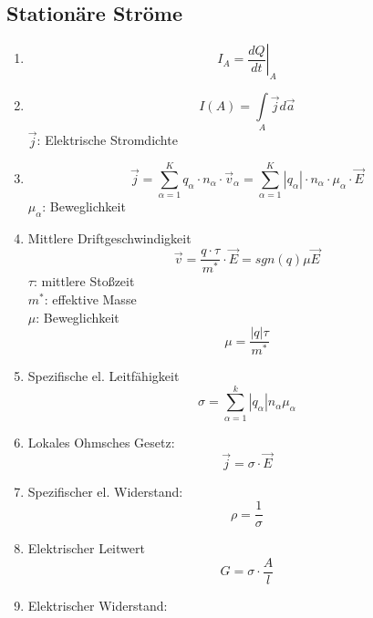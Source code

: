 \documentclass[a4paper,twocolumn,10pt]{article}
\begin{document}
\subsection{Stationäre Ströme}
\begin{enumerate}[label=$\bullet$]
\item
\begin{equation*}
I_A=\left.\frac{dQ}{dt}\right|_A
\end{equation*}
\item
\begin{equation*}
I(A)=\int\limits_{A}\overrightarrow{j}d\overrightarrow{a}
\end{equation*}
$\overrightarrow{j}$: Elektrische Stromdichte
\item
\begin{equation*}
\overrightarrow{j}=\sum\limits_{\alpha=1}^{K}q_\alpha\cdot n_\alpha\cdot\overrightarrow{v}_\alpha=\sum\limits_{\alpha=1}^{K}|q_\alpha |\cdot n_\alpha\cdot\mu_\alpha\cdot\overrightarrow{E}
\end{equation*}
$\mu_\alpha$: Beweglichkeit
\item Mittlere Driftgeschwindigkeit
\begin{equation*}
\overrightarrow{v}=\frac{q\cdot\tau}{m^*}\cdot\overrightarrow{E}=sgn(q)\mu\overrightarrow{E}
\end{equation*}
$\tau$: mittlere Stoßzeit\\
$m^*$: effektive Masse\\
$\mu$: Beweglichkeit
\begin{equation*}
\mu=\frac{|q|\tau}{m^*}
\end{equation*}
\item Spezifische el. Leitfähigkeit
\begin{equation*}
\sigma=\sum\limits_{\alpha=1}^{k}|q_\alpha |n_\alpha\mu_\alpha
\end{equation*}
\item Lokales Ohmsches Gesetz:
\begin{equation*}
\overrightarrow{j}=\sigma\cdot\overrightarrow{E}
\end{equation*}
\item Spezifischer el. Widerstand:
\begin{equation*}
\rho =\frac{1}{\sigma}
\end{equation*}
\item Elektrischer Leitwert
\begin{equation*}
G=\sigma\cdot\frac{A}{l}
\end{equation*}
\item Elektrischer Widerstand:

\end{enumerate}
\end{document}
